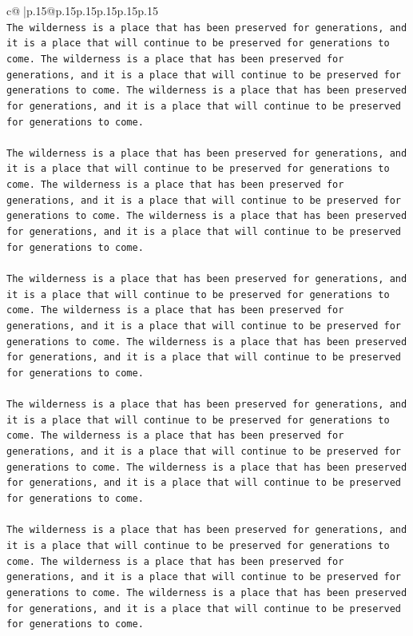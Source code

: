 \documentclass{article}
\begin{document}
{\begin{supertabular}{c@{$\;$}|p{.15\linewidth}@{}p{.15\linewidth}p{.15\linewidth}p{.15\linewidth}p{.15\linewidth}p{.15\linewidth}}
{{{\\ 
\texttt{The wilderness is a place that has been preserved for generations, and it is a place that will continue to be preserved for generations to come. The wilderness is a place that has been preserved for generations, and it is a place that will continue to be preserved for generations to come. The wilderness is a place that has been preserved for generations, and it is a place that will continue to be preserved for generations to come.} \\
\\ 
\texttt{The wilderness is a place that has been preserved for generations, and it is a place that will continue to be preserved for generations to come. The wilderness is a place that has been preserved for generations, and it is a place that will continue to be preserved for generations to come. The wilderness is a place that has been preserved for generations, and it is a place that will continue to be preserved for generations to come.} \\
\\ 
\texttt{The wilderness is a place that has been preserved for generations, and it is a place that will continue to be preserved for generations to come. The wilderness is a place that has been preserved for generations, and it is a place that will continue to be preserved for generations to come. The wilderness is a place that has been preserved for generations, and it is a place that will continue to be preserved for generations to come.} \\
\\ 
\texttt{The wilderness is a place that has been preserved for generations, and it is a place that will continue to be preserved for generations to come. The wilderness is a place that has been preserved for generations, and it is a place that will continue to be preserved for generations to come. The wilderness is a place that has been preserved for generations, and it is a place that will continue to be preserved for generations to come.} \\
\\ 
\texttt{The wilderness is a place that has been preserved for generations, and it is a place that will continue to be preserved for generations to come. The wilderness is a place that has been preserved for generations, and it is a place that will continue to be preserved for generations to come. The wilderness is a place that has been preserved for generations, and it is a place that will continue to be preserved for generations to come.} \\
}}}
\end{supertabular}}
\end{document}
